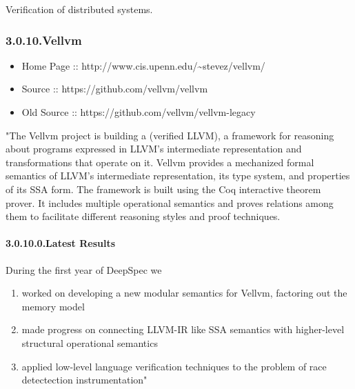 \documentclass[12pt,twoside]{article}
\begin{document}
\noindent{}Verification of distributed systems.%

\subsubsection{3.0.10.\hspace*{0.5em}Vellvm}\label{sec-vellvm}%

\begin{itemize}[noitemsep,topsep=\mdcompacttopsep]%

\item{}Home Page :: http://www.cis.upenn.edu/\textasciitilde{}stevez/vellvm/%

\item{}Source :: https://github.com/vellvm/vellvm%

\item{}Old Source :: https://github.com/vellvm/vellvm-legacy%
\end{itemize}%

\noindent{}"The Vellvm project is building a (verified LLVM), a framework for
reasoning about programs expressed in LLVM's intermediate
representation and transformations that operate on it. Vellvm provides
a mechanized formal semantics of LLVM's intermediate representation,
its type system, and properties of its SSA form. The framework is
built using the Coq interactive theorem prover. It includes multiple
operational semantics and proves relations among them to facilitate
different reasoning styles and proof techniques.%

\paragraph{3.0.10.0.\hspace*{0.5em}Latest Results}\label{sec-latest-results}%

\noindent{}During the first year of DeepSpec we%

\begin{enumerate}%

\item{}
worked on developing a new modular semantics for Vellvm, factoring out the memory model%

\item{}
made progress on connecting LLVM-IR like SSA semantics with higher-level structural operational semantics%

\item{}
applied low-level language verification techniques to the problem of race detectection instrumentation"%
\end{enumerate}%
\end{document}
